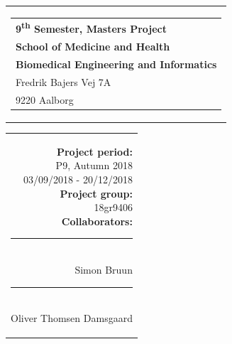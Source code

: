 % 
\thispagestyle{empty}
\begin{titlepage}
{\samepage 

\begin{tabular}{r}
\parbox{\textwidth}{  
\hfill \hspace{2cm} \parbox{8cm}{\begin{tabular}{l} %
{\small \textbf{\textcolor{aaublue}{{9\textsuperscript{th} Semester, Masters Project}}}}\\
{\small \textbf{\textcolor{aaublue}{School of Medicine and Health}}}\\
{\small \textbf{\textcolor{aaublue}{Biomedical Engineering and Informatics}}}\\
{\small \textcolor{aaublue}{Fredrik Bajers Vej 7A}} \\
{\small \textcolor{aaublue}{9220 Aalborg}} \\
\end{tabular}}}
\end{tabular}

\begin{tabular}{r}
	\parbox{5cm}{
	\textbf{Project period:}\\
	P9, Autumn 2018\\
	03/09/2018 - 20/12/2018\\
	
	\textbf{Project group:}\\
	18gr9406\\ %
	
	\textbf{Collaborators:}\\
	\rule{5cm}{1pt}\\
	Simon Bruun \\
	\rule{5cm}{1pt}\\
	Oliver Thomsen Damsgaard \\
	
}
\end{tabular}}
\end{titlepage}
